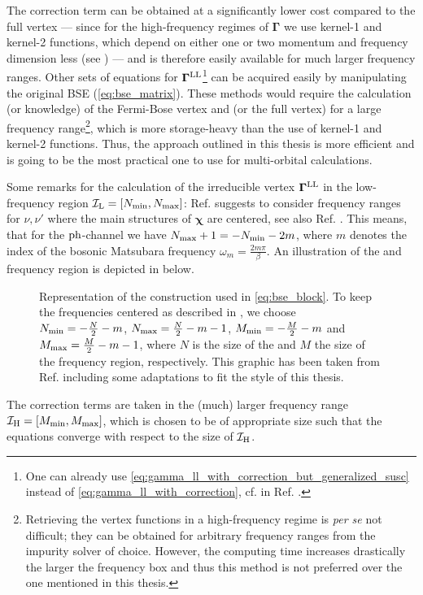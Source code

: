 \documentclass[../../main.tex]{subfiles}
\begin{document}
The correction term can be obtained at a significantly lower cost compared to the full vertex --- since for the high-frequency regimes of $\bm\Gamma$ we use kernel-1 and kernel-2 functions, which depend on either one or two momentum and frequency dimension less (see ) --- and is therefore easily available for much larger frequency ranges. Other sets of equations for $\bm\Gamma^{\text{L}\text{L}}$\footnote{One can already use \eqref{eq:gamma_ll_with_correction_but_generalized_susc} instead of \eqref{eq:gamma_ll_with_correction}, cf.  in Ref. \cite{efficient bse}.} can be acquired easily by manipulating the original BSE (\ref{eq:bse_matrix}). These methods would require the calculation (or knowledge) of the Fermi-Bose vertex and  (or the full vertex) for a large frequency range\footnote{Retrieving the vertex functions in a high-frequency regime is \textit{per se} not difficult; they can be obtained for arbitrary frequency ranges from the impurity solver of choice. However, the computing time increases drastically the larger the frequency box and thus this method is not preferred over the one mentioned in this thesis.}, which is more storage-heavy than the use of kernel-1 and kernel-2 functions. Thus, the approach outlined in this thesis is more efficient and is going to be the most practical one to use for multi-orbital calculations.

Some remarks for the calculation of the irreducible vertex $\bm\Gamma^{\text{L}\text{L}}$ in the low-frequency region $\mathcal{I}_{\text{L}}=[N_{\text{min}},N_{\text{max}}]$: Ref. \cite{efficient bse} suggests to consider frequency ranges for $\nu,\nu'$ where the main structures of $\bm\chi$ are centered, see also Ref. \cite{local corr at the two-particle level}. This means, that for the $\text{ph}$-channel we have $N_{\text{max}}+1=-N_{\text{min}}-2m$, where $m$ denotes the index of the bosonic Matsubara frequency $\omega_{m}=\frac{2m\pi}{\beta}$. An illustration of the  and  frequency region is depicted in  below.
\begin{figure}[ht!]
	\centering
  	
  	\caption{Representation of the  construction used in \eqref{eq:bse_block}. To keep the frequencies centered as described in \cite{rohringer two particle level}, we choose $N_{\text{min}}=-\frac{N}{2}-m$, $N_{\text{max}}=\frac{N}{2}-m-1$, $M_{\text{min}}=-\frac{M}{2}-m$ and $M_{\text{max}}=\frac{M}{2}-m-1$, where $N$ is the size of the  and $M$ the size of the  frequency region, respectively. This graphic has been taken from Ref. \cite{efficient BSE} including some adaptations to fit the style of this thesis.}
  	\label{fig:frequency_boxes}
\end{figure}
The correction terms are taken in the (much) larger frequency range $\mathcal{I}_{\text{H}}=[M_{\text{min}}, M_{\text{max}}]$, which is chosen to be of appropriate size such that the equations converge with respect to the size of $\mathcal{I}_{\text{H}}$.
\end{document}

